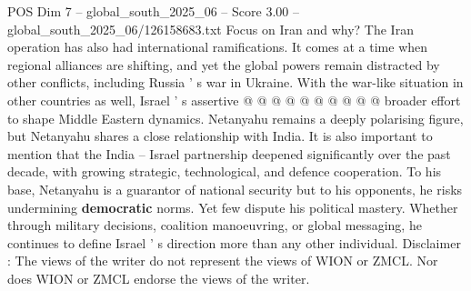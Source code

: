 \begin{textsample}{POS Dim 7 – global\_south\_2025\_06 – Score 3.00 – global\_south\_2025\_06/126158683.txt}
Focus on Iran and why?
The Iran operation has also had international ramifications.
It comes at a time when regional alliances are shifting, and yet the global powers remain distracted by other conflicts, including Russia ' s war in Ukraine.
With the war-like situation in other countries as well, Israel ' s assertive @ @ @ @ @ @ @ @ @ @ broader effort to shape Middle Eastern dynamics.
Netanyahu remains a deeply polarising figure, but Netanyahu shares a close relationship with India.
It is also important to mention that the India -- Israel partnership deepened significantly over the past decade, with growing strategic, technological, and defence cooperation.
To his base, Netanyahu is a guarantor of national security but to his opponents, he risks undermining \textbf{democratic} norms.
Yet few dispute his political mastery.
Whether through military decisions, coalition manoeuvring, or global messaging, he continues to define Israel ' s direction more than any other individual.
Disclaimer : The views of the writer do not represent the views of WION or ZMCL.
Nor does WION or ZMCL endorse the views of the writer.

\end{textsample}
